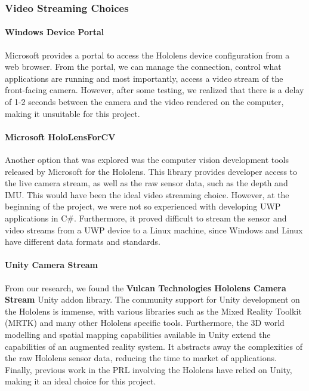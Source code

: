 \subsubsection{Video Streaming Choices} 

\paragraph{Windows Device Portal} Microsoft provides a portal to access the Hololens device configuration from a web browser. From the portal, we can manage the connection, control what applications are running and most importantly, access a video stream of the front-facing camera. However, after some testing, we realized that there is a delay of 1-2 seconds between the camera and the video rendered on the computer, making it unsuitable for this project.

\paragraph{Microsoft HoloLensForCV} Another option that was explored was the computer vision development tools released by Microsoft for the Hololens. This library provides developer access to the live camera stream, as well as the raw sensor data, such as the depth and IMU. This would have been the ideal video streaming choice. However, at the beginning of the project, we were not so experienced with developing UWP applications in C\#. Furthermore, it proved difficult to stream the sensor and video streams from a UWP device to a Linux machine, since Windows and Linux have different data formats and standards.

\paragraph{Unity Camera Stream} From our research, we found the \textbf{Vulcan Technologies Hololens Camera Stream} Unity addon library. The community support for Unity development on the Hololens is immense, with various libraries such as the Mixed Reality Toolkit (MRTK) and many other Hololens specific tools. Furthermore, the 3D world modelling and spatial mapping capabilities available in Unity extend the capabilities of an augmented reality system. It abstracts away the complexities of the raw Hololens sensor data, reducing the time to market of applications. Finally, previous work in the PRL involving the Hololens have relied on Unity, making it an ideal choice for this project.

